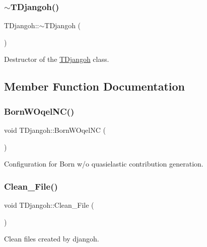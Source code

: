 \subsubsection{\texorpdfstring{$\sim$\+T\+Djangoh()}{~TDjangoh()}}
{\footnotesize\ttfamily T\+Djangoh\+::$\sim$\+T\+Djangoh (\begin{DoxyParamCaption}{ }\end{DoxyParamCaption})\hspace{0.3cm}{\ttfamily [virtual]}}



Destructor of the \hyperlink{class_t_djangoh}{T\+Djangoh} class. 



\subsection{Member Function Documentation}
\mbox{\label{class_t_djangoh_acbf402e049af75c65f28589178eb1487}} 
\subsubsection{\texorpdfstring{Born\+W\+Oqel\+N\+C()}{BornWOqelNC()}}
{\footnotesize\ttfamily void T\+Djangoh\+::\+Born\+W\+Oqel\+NC (\begin{DoxyParamCaption}{ }\end{DoxyParamCaption})}



Configuration for Born w/o quasielastic contribution generation. 

\mbox{\label{class_t_djangoh_adf5acc5294013735f2475d4ce8ccf012}} 
\subsubsection{\texorpdfstring{Clean\+\_\+\+File()}{Clean\_File()}}
{\footnotesize\ttfamily void T\+Djangoh\+::\+Clean\+\_\+\+File (\begin{DoxyParamCaption}{ }\end{DoxyParamCaption})}



Clean files created by djangoh. 

